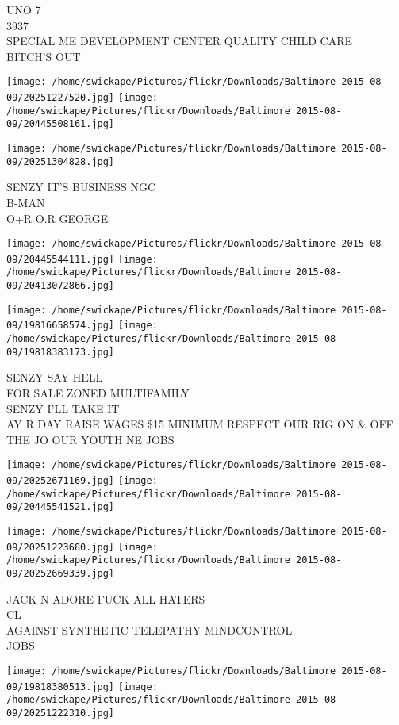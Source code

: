 \documentclass[10pt,letterpaper]{article}
\begin{document}
UNO 7\\
3937\\
SPECIAL ME DEVELOPMENT CENTER QUALITY CHILD CARE\\
BITCH'S OUT
\pagebreak

\texttt{[image: /home/swickape/Pictures/flickr/Downloads/Baltimore 2015-08-09/20251227520.jpg]}
\texttt{[image: /home/swickape/Pictures/flickr/Downloads/Baltimore 2015-08-09/20445508161.jpg]}

\vspace{0.25in}
\texttt{[image: /home/swickape/Pictures/flickr/Downloads/Baltimore 2015-08-09/20251304828.jpg]}

SENZY IT'S BUSINESS NGC\\
B{-}MAN\\
O+R O.R GEORGE
\pagebreak

\texttt{[image: /home/swickape/Pictures/flickr/Downloads/Baltimore 2015-08-09/20445544111.jpg]}
\texttt{[image: /home/swickape/Pictures/flickr/Downloads/Baltimore 2015-08-09/20413072866.jpg]}

\texttt{[image: /home/swickape/Pictures/flickr/Downloads/Baltimore 2015-08-09/19816658574.jpg]}
\texttt{[image: /home/swickape/Pictures/flickr/Downloads/Baltimore 2015-08-09/19818383173.jpg]}

SENZY SAY HELL\\
FOR SALE ZONED MULTIFAMILY\\
SENZY I'LL TAKE IT\\
AY R DAY RAISE WAGES \$15 MINIMUM RESPECT OUR RIG ON \& OFF THE JO OUR YOUTH NE JOBS
\pagebreak

\texttt{[image: /home/swickape/Pictures/flickr/Downloads/Baltimore 2015-08-09/20252671169.jpg]}
\texttt{[image: /home/swickape/Pictures/flickr/Downloads/Baltimore 2015-08-09/20445541521.jpg]}

\texttt{[image: /home/swickape/Pictures/flickr/Downloads/Baltimore 2015-08-09/20251223680.jpg]}
\texttt{[image: /home/swickape/Pictures/flickr/Downloads/Baltimore 2015-08-09/20252669339.jpg]}

JACK N ADORE FUCK ALL HATERS\\
CL\\
AGAINST SYNTHETIC TELEPATHY MINDCONTROL\\
JOBS
\pagebreak

\texttt{[image: /home/swickape/Pictures/flickr/Downloads/Baltimore 2015-08-09/19818380513.jpg]}
\texttt{[image: /home/swickape/Pictures/flickr/Downloads/Baltimore 2015-08-09/20251222310.jpg]}
\end{document}
